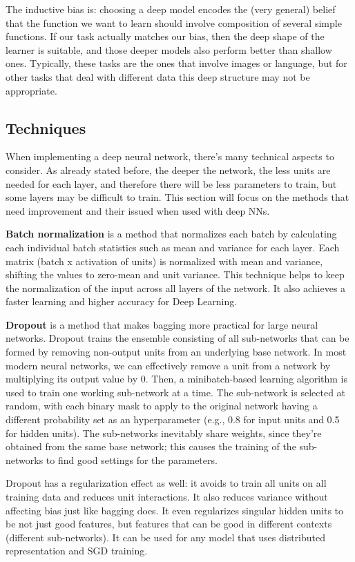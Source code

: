 The inductive bias is: choosing a deep model encodes the (very general) belief that the function we want to learn should involve composition of several simple functions. If our task actually matches our bias, then the deep shape of the learner is suitable, and those deeper models also perform better than shallow ones. Typically, these tasks are the ones that involve images or language, but for other tasks that deal with different data this deep structure may not be appropriate.

\subsection{Techniques}

When implementing a deep neural network, there's many technical aspects to consider. As already stated before, the deeper the network, the less units are needed for each layer, and therefore there will be less parameters to train, but some layers may be difficult to train. This section will focus on the methods that need improvement and their issued when used with deep NNs.

\textbf{Batch normalization} is a method that normalizes each batch by calculating each individual batch statistics such as mean and variance for each layer. Each matrix (batch x activation of units) is normalized with mean and variance, shifting the values to zero-mean and unit variance. This technique helps to keep the normalization of the input across all layers of the network. It also achieves a faster learning and higher accuracy for Deep Learning.

\textbf{Dropout} is a method that makes bagging more practical for large neural networks. Dropout trains the ensemble consisting of all sub-networks that can be formed by removing non-output units from an underlying base network. In most modern neural networks, we can effectively remove a unit from a network by multiplying its output value by 0. Then, a minibatch-based learning algorithm is used to train one working sub-network at a time. The sub-network is selected at random, with each binary mask to apply to the original network having a different probability set as an hyperparameter (e.g., 0.8 for input units and 0.5 for hidden units). The sub-networks inevitably share weights, since they're obtained from the same base network; this causes the training of the sub-networks to find good settings for the parameters.

Dropout has a regularization effect as well: it avoids to train all units on all training data and reduces unit interactions. It also reduces variance without affecting bias just like bagging does. It even regularizes singular hidden units to be not just good features, but features that can be good in different contexts (different sub-networks). It can be used for any model that uses distributed representation and SGD training.

